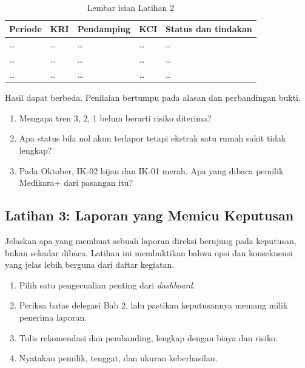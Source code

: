 \begin{table}[!htb]
  \centering\small
  \caption{Lembar isian Latihan 2}\label{tab:ch13-lat2-hasil}
  \begin{tabularx}{\textwidth}{|>{\raggedright\arraybackslash}p{}|>{\raggedright\arraybackslash}p{}|>{\raggedright\arraybackslash}p{}|>{\raggedright\arraybackslash}p{}|>{\raggedright\arraybackslash}X|}
    \hline
    \textbf{Periode} & \textbf{KRI} & \textbf{Pendamping} & \textbf{KCI} & \textbf{Status dan
    tindakan} \\ \hline
    \dots & \dots & \dots & \dots & \dots \\ \hline
    \dots & \dots & \dots & \dots & \dots \\ \hline
    \dots & \dots & \dots & \dots & \dots \\ \hline
  \end{tabularx}
\end{table}

Hasil dapat berbeda. Penilaian bertumpu pada alasan dan perbandingan bukti.
\begin{enumerate}
  \item Mengapa tren 3, 2, 1 belum berarti risiko diterima?
  \item Apa status bila nol akun terlapor tetapi ekstrak satu rumah sakit tidak lengkap?
  \item Pada Oktober, IK-02 hijau dan IK-01 merah. Apa yang dibaca pemilik Medikara+ dari pasangan
  itu?
\end{enumerate}

\subsection*{Latihan 3: Laporan yang Memicu Keputusan}

Jelaskan apa yang membuat sebuah laporan direksi berujung pada keputusan, bukan sekadar dibaca.
Latihan ini membuktikan bahwa opsi dan konsekuensi yang jelas lebih berguna dari daftar kegiatan.
\begin{enumerate}
  \item Pilih satu pengecualian penting dari \textit{dashboard}.
  \item Periksa batas delegasi Bab 2, lalu pastikan keputusannya memang milik penerima laporan.
  \item Tulis rekomendasi dan pembanding, lengkap dengan biaya dan risiko.
  \item Nyatakan pemilik, tenggat, dan ukuran keberhasilan.
\end{enumerate}

